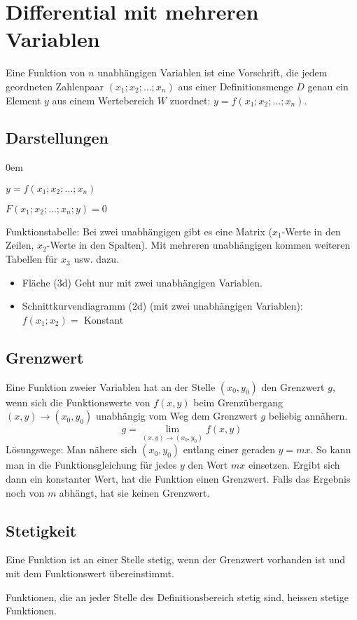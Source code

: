 \section{Differential mit mehreren Variablen}
Eine Funktion von $n$ unabhängigen Variablen ist eine Vorschrift, die jedem geordneten Zahlenpaar $(x_1; x_2; \dots; x_n)$ aus einer Definitionsmenge $D$ genau ein Element $y$ aus einem Wertebereich $W$ zuordnet: $y = f(x_1; x_2; \dots; x_n)$.
\subsection{Darstellungen}
\begin{description}\itemsep0em
	\item [Explizit] $y = f(x_1; x_2; \dots; x_n)$
	\item [Implizit] $F(x_1; x_2; \dots; x_n; y) = 0$
	\item Funktionstabelle: Bei zwei unabhängigen gibt es eine Matrix ($x_1$-Werte in den Zeilen, $x_2$-Werte in den Spalten). Mit mehreren unabhängigen kommen weiteren Tabellen
	für $x_3$ usw. dazu.
	\item [Graphisch]
		\begin{itemize}\itemsep0em
			\item Fläche (3d) Geht nur mit zwei unabhängigen Variablen.
			\item Schnittkurvendiagramm (2d) (mit zwei unabhängigen Variablen): $f(x_1; x_2) = $ Konstant
		\end{itemize}
\end{description}
 
\subsection{Grenzwert}
Eine Funktion zweier Variablen hat an der Stelle $(x_0, y_0)$ den Grenzwert $g$, wenn sich die Funktionswerte von $f(x, y)$ beim Grenzübergang $(x, y) \rightarrow (x_0, y_0)$ unabhängig vom Weg dem Grenzwert $g$ beliebig annähern.
\begin{equation*}
	g = \lim_{(x, y) \rightarrow (x_0, y_0)} f(x, y)
\end{equation*}
Lösungswege: Man nähere sich $(x_0, y_0)$ entlang einer geraden $y = mx$. So kann man in die Funktionsgleichung für jedes $y$ den Wert $mx$ einsetzen. Ergibt sich dann ein konstanter Wert, hat die Funktion einen Grenzwert. Falls das Ergebnis noch von $m$ abhängt, hat sie keinen Grenzwert.

\subsection{Stetigkeit}
Eine Funktion ist an einer Stelle stetig, wenn der Grenzwert vorhanden ist und mit dem Funktionswert übereinstimmt.

Funktionen, die an jeder Stelle des Definitionsbereich stetig sind, heissen stetige Funktionen.
